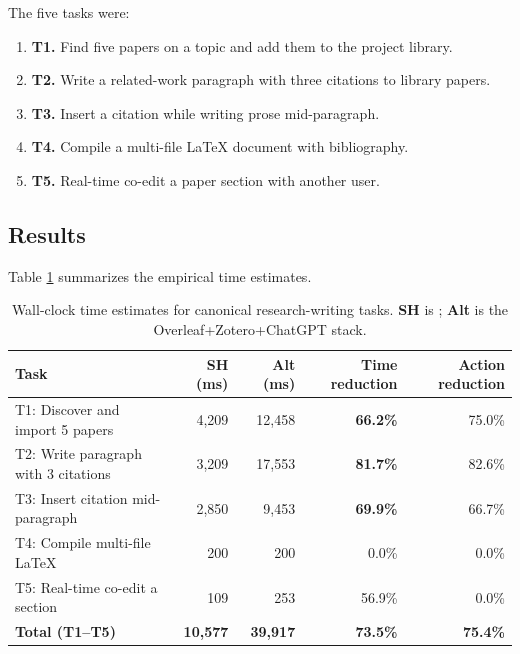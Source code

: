 The five tasks were:

\begin{enumerate}
    \item \textbf{T1.} Find five papers on a topic and add them to the project library.
    \item \textbf{T2.} Write a related-work paragraph with three citations to library papers.
    \item \textbf{T3.} Insert a citation while writing prose mid-paragraph.
    \item \textbf{T4.} Compile a multi-file LaTeX document with bibliography.
    \item \textbf{T5.} Real-time co-edit a paper section with another user.
\end{enumerate}

\subsection{Results}

Table \ref{tab:study3-times} summarizes the empirical time estimates.

\begin{table}[h]
\centering
\caption{Wall-clock time estimates for canonical research-writing tasks. \textbf{SH} is \sh{}; \textbf{Alt} is the Overleaf+Zotero+ChatGPT stack.}
\label{tab:study3-times}
\small
\begin{tabularx}{\textwidth}{X r r r r}
\toprule
\textbf{Task} & \textbf{SH (ms)} & \textbf{Alt (ms)} & \textbf{Time reduction} & \textbf{Action reduction} \\
\midrule
T1: Discover and import 5 papers       &  4{,}209 & 12{,}458 & \textbf{66.2\%} & 75.0\% \\
T2: Write paragraph with 3 citations   &  3{,}209 & 17{,}553 & \textbf{81.7\%} & 82.6\% \\
T3: Insert citation mid-paragraph      &  2{,}850 &  9{,}453 & \textbf{69.9\%} & 66.7\% \\
T4: Compile multi-file LaTeX           &     200  &     200  &     0.0\% & 0.0\% \\
T5: Real-time co-edit a section        &     109  &     253  &    56.9\% & 0.0\% \\
\midrule
\textbf{Total (T1--T5)}                & \textbf{10{,}577} & \textbf{39{,}917} & \textbf{73.5\%} & \textbf{75.4\%} \\
\bottomrule
\end{tabularx}
\end{table}

